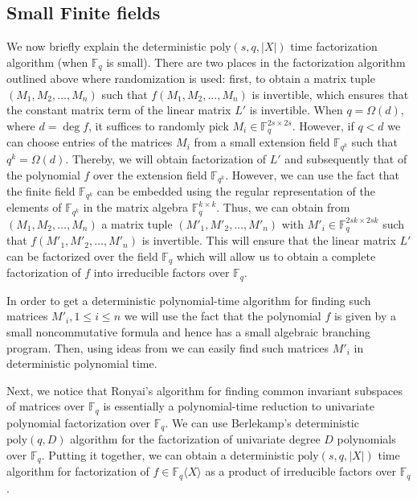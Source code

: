 \documentclass[10pt,a4paper]{article}
\newcommand{\F}{\mathbb{F}}
\renewcommand{\angle}[1]{\langle #1 \rangle}
\newcommand{\poly}{\mathrm{poly}}
\begin{document}
\subsection{Small Finite fields}\label{small-field}

We now briefly explain the deterministic $\poly(s,q,|X|)$ time
factorization algorithm (when $\F_q$ is small). There are two places
in the factorization algorithm outlined above where randomization is
used: first, to obtain a matrix tuple $(M_1,M_2,\ldots,M_n)$ such that
$f(M_1,M_2,\ldots,M_n)$ is invertible, which ensures that the constant
matrix term of the linear matrix $L'$ is invertible. When
$q=\Omega(d)$, where $d= \deg f$, it suffices to randomly pick
$M_i\in\F_q^{2s\times 2s}$. However, if $q<d$ we can choose entries of
the matrices $M_i$ from a small extension field $\F_{q^k}$ such that
$q^k=\Omega(d)$.  Thereby, we will obtain factorization of $L'$ and
subsequently that of the polynomial $f$ over the extension field
$\F_{q^k}$. However, we can use the fact that the finite field
$\F_{q^k}$ can be embedded using the regular representation of the
elements of $\F_{q^k}$ in the matrix algebra $\F_q^{k\times k}$. Thus,
we can obtain from $(M_1,M_2,\ldots,M_n)$ a matrix tuple
$(M'_1,M'_2,\ldots,M'_n)$ with $M'_i\in\F_q^{2sk\times 2sk}$ such that
$f(M'_1,M'_2,\ldots,M'_n)$ is invertible. This will ensure that the
linear matrix $L'$ can be factorized over the field $\F_q$ which will
allow us to obtain a complete factorization of $f$ into irreducible
factors over $\F_q$.

In order to get a deterministic polynomial-time algorithm for finding
such matrices $M'_i, 1\le i\le n$ we will use the fact that the
polynomial $f$ is given by a small noncommutative formula and hence
has a small algebraic branching program. Then, using ideas from
\cite{RS05,F14,ACDM20} we can easily find such matrices $M'_i$ in
deterministic polynomial time.

Next, we notice that Ronyai's algorithm for finding common invariant
subspaces of matrices over $\F_q$ is essentially a polynomial-time
reduction to univariate polynomial factorization over $\F_q$. We can
use Berlekamp's deterministic $\poly(q,D)$ algorithm for the
factorization of univariate degree $D$ polynomials over
$\F_q$. Putting it together, we can obtain a deterministic
$\poly(s,q,|X|)$ time algorithm for factorization of
$f\in\F_q\angle{X}$ as a product of irreducible factors over
$\F_q$.\smallskip
\end{document}
